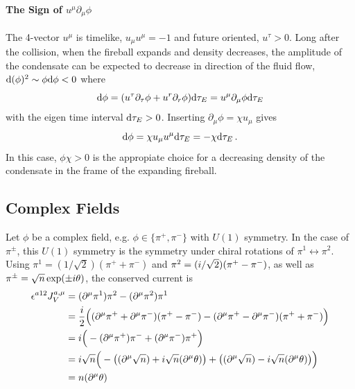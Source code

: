 \paragraph{The Sign of $u^\mu\partial_\mu\phi$}

The 4-vector $u^\mu$ is timelike, ${u_\mu u^\mu=-1}$ and future oriented, $u^\tau>0$. Long after the collision, when the fireball expands and density decreases, the amplitude of the condensate can be expected to decrease in direction of the fluid flow, ${\text{d}(\phi)^2\sim\phi\text{d}\phi<0}$ where
\begin{equation}
    \text{d}\phi=(u^\tau\partial_\tau\phi+u^r\partial_r\phi)\text{d}\tau_E=u^\mu\partial_\mu\phi\text{d}\tau_E
\end{equation}
with the eigen time interval $\text{d}\tau_E>0$. Inserting ${\partial_\mu\phi=\chi u_\mu}$ gives
\begin{equation}
    \text{d}\phi=\chi u_\mu u^\mu\text{d}\tau_E=-\chi\text{d}\tau_E\,.
\end{equation}
In this case, $\phi\chi>0$ is the appropiate choice for a decreasing density of the condensate in the frame of the expanding fireball.

\subsection{Complex Fields}

Let $\phi$ be a complex field, e.g. $\phi\in\{\pi^+,\pi^-\}$ with $U(1)$ symmetry. In the case of $\pi^\pm$, this $U(1)$ symmetry is the symmetry under chiral rotations of $\pi^1\leftrightarrow\pi^2$. Using $\pi^1=(1/\sqrt{2})(\pi^++\pi^-)$ and $\pi^2=({i}/\sqrt{2})(\pi^+-\pi^-)$, as well as $\pi^\pm=\sqrt{n}\exp(\pm{i}\theta)$, the conserved current is
\begin{align}
    \epsilon^{a12}J_V^{a,\mu}&=(\partial^\mu\pi^1)\pi^2-(\partial^\mu\pi^2)\pi^1\\
    &=\frac{{i}}{2}\Big((\partial^\mu\pi^++\partial^\mu\pi^-)(\pi^+-\pi^-)-(\partial^\mu\pi^+-\partial^\mu\pi^-)(\pi^++\pi^-)\Big)\\
    &={i}\Big(-(\partial^\mu\pi^+)\pi^-+(\partial^\mu\pi^-)\pi^+\Big)\\
    &={i}\sqrt{n}\Big(-\big((\partial^\mu\sqrt{n})+{i}\sqrt{n}(\partial^\mu\theta)\big)+\big((\partial^\mu\sqrt{n})-{i}\sqrt{n}(\partial^\mu\theta)\big)\Big)\\
    &=n(\partial^\mu\theta)
\end{align}

